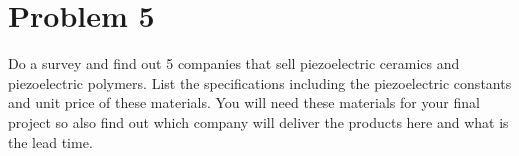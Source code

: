\documentclass[../main.tex]{subfiles}
\begin{document}
\begin{figure}[ht!]
    \centering
\end{figure}


\section{Problem 5}

Do a survey and find out 5 companies that sell piezoelectric ceramics and piezoelectric polymers. 
List the specifications including the piezoelectric constants and unit price of these materials. 
You will need these materials for your final project so also find out which company will deliver the products here and what is the lead time.
\end{document}
